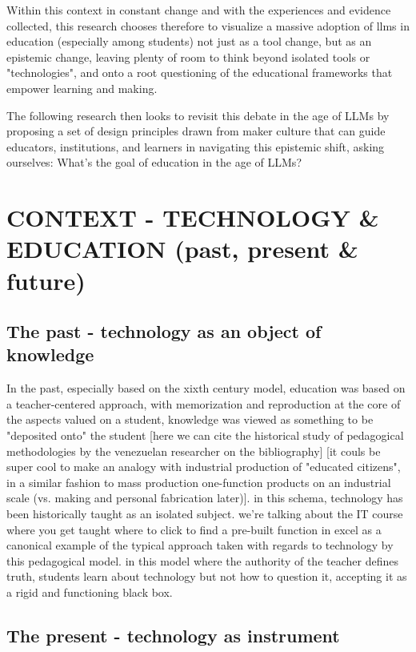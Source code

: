 \documentclass{article}
\begin{document}
Within this context in constant change and with the experiences and evidence collected, this research chooses therefore to visualize a massive adoption of llms in education (especially among students) not just as a tool change, but as an epistemic change, leaving plenty of room to think beyond isolated tools or "technologies", and onto a root questioning of the educational frameworks that empower learning and making.

The following research then looks to revisit this debate in the age of LLMs by proposing a set of design principles drawn from maker culture that can guide educators, institutions, and learners in navigating this epistemic shift, asking ourselves: What's the goal of education in the age of LLMs? 

\section{CONTEXT - TECHNOLOGY \& EDUCATION (past, present \& future)}

\subsection{The past - technology as an object of knowledge}

In the past, especially based on the xixth century model, education was based on a teacher-centered approach, with memorization and reproduction at the core of the aspects valued on a student, knowledge was viewed as something to be "deposited onto" the student [here we can cite the historical study of pedagogical methodologies by the venezuelan researcher on the bibliography] [it couls be super cool to make an analogy with industrial production of "educated citizens", in a similar fashion to mass production one-function products on an industrial scale (vs. making and personal fabrication later)]. in this schema, technology has been historically taught as an isolated subject. we're talking about the IT course where you get taught where to click to find a pre-built function in excel as a canonical example of the typical approach taken with regards to technology by this pedagogical model. in this model where the authority of the teacher defines truth, students learn about technology but not how to question it, accepting it as a rigid and functioning black box.

\subsection{The present - technology as instrument}
\end{document}
